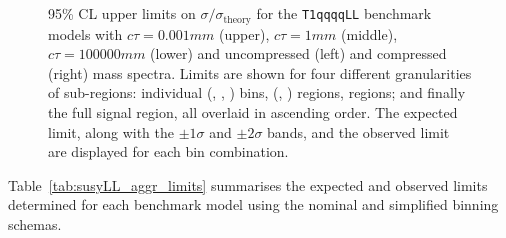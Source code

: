 \begin{figure}[!h]
{    \label{fig:T1qqqqLL_ctau_1_compressed_limitsPerBin}
  } \\
   ~~
   \\
  \caption{ 95\% CL upper limits on $\sigma/\sigma_{\mathrm{theory}}$
    for the \texttt{T1qqqqLL} benchmark models with
    $c\tau=0.001\unit{mm}$ (upper), $c\tau=1\unit{mm}$ (middle),
    $c\tau=100000\unit{mm}$ (lower) and uncompressed (left) and
    compressed (right) mass spectra. Limits are shown for four
    different granularities of sub-regions: individual (\njet, \nb,
    \scalht) bins, (\njet, \nb) regions, \njet regions; and finally
    the full signal region, all overlaid in ascending order. The
    expected limit, along with the $\pm 1\sigma$ and $\pm 2\sigma$
    bands, and the observed limit are displayed for each bin
    combination.  }
  \label{fig:T1qqqqLL_limitsPerBin}
\end{figure}

Table~\ref{tab:susyLL_aggr_limits} summarises the expected and
observed limits determined for each benchmark model using the nominal
and simplified binning schemas.

